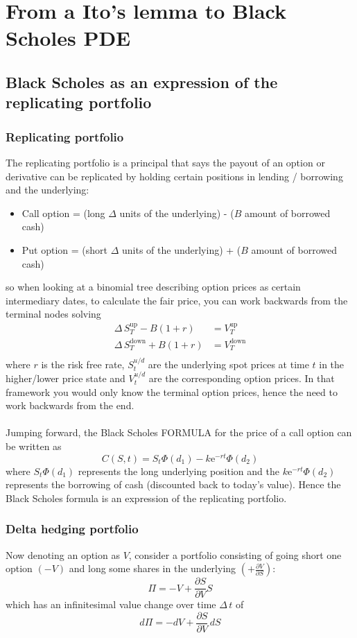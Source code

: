 \documentclass[12pt]{article}
\newcommand{\dpart}[2]{\frac{\partial #1}{\partial #2}}
\begin{document}
\section{From a Ito's lemma to Black Scholes PDE}
\subsection{Black Scholes as an expression of the replicating portfolio}
\subsubsection{Replicating portfolio}
The replicating portfolio is a principal that says the payout of an option or derivative can be replicated by holding certain positions in lending / borrowing and the underlying:
\begin{itemize}
	\item Call option = (long $\Delta$ units of the underlying) - ($B$ amount of borrowed cash)
	\item Put option = (short $\Delta$ units of the underlying) + ($B$ amount of borrowed cash)
\end{itemize}
so when looking at a binomial tree describing option prices as certain intermediary dates, to calculate the fair price, you can work backwards from the terminal nodes solving
\begin{align}
	\Delta\,S^{\mathrm{up}}_T-B(1+r)&=V^{\mathrm{up}}_T\\
	\Delta\,S^{\mathrm{down}}_T+B(1+r)&=V^{\mathrm{down}}_T\\
\end{align}
where $r$ is the risk free rate, $S_t^{u/d}$ are the underlying spot prices at time $t$ in the higher/lower price state and $V_t^{u/d}$ are the corresponding option prices. In that framework you would only know the terminal option prices, hence the need to work backwards from the end.\\
\\
Jumping forward, the Black Scholes FORMULA for the price of a call option can be written as
\begin{equation}
	C(S,t)=S_t\Phi(d_1) - k\mathrm{e}^{-rt}\Phi(d_2)
\end{equation}
where $S_t\Phi(d_1)$ represents the long underlying position and the $k\mathrm{e}^{-rt}\Phi(d_2)$ represents the borrowing of cash (discounted back to today's value). Hence the Black Scholes formula is an expression of the replicating portfolio.

\subsubsection{Delta hedging portfolio}
Now denoting an option as $V$, consider a portfolio consisting of going short one option $(-V)$ and long some shares in the underlying $(+\dpart{V}{S})$:
\begin{equation}
	\Pi=-V+\dpart{S}{V}S
\end{equation}
which has an infinitesimal value change over time $\Delta\,t$ of
\begin{equation}
	d\Pi=-dV+\dpart{S}{V}\,dS
\end{equation}
\end{document}
